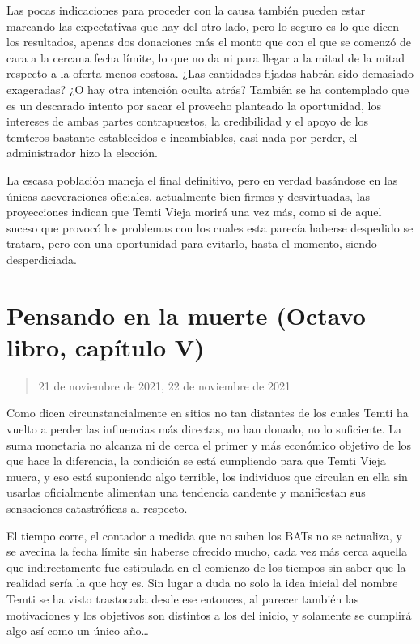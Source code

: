 \documentclass[
  spanish,
]{book}
\begin{document}
Las pocas indicaciones para proceder con la causa también pueden estar marcando las expectativas que hay del otro lado, pero lo seguro es lo que dicen los resultados, apenas dos donaciones más el monto que con el que se comenzó de cara a la cercana fecha límite, lo que no da ni para llegar a la mitad de la mitad respecto a la oferta menos costosa. ¿Las cantidades fijadas habrán sido demasiado exageradas? ¿O hay otra intención oculta atrás? También se ha contemplado que es un descarado intento por sacar el provecho planteado la oportunidad, los intereses de ambas partes contrapuestos, la credibilidad y el apoyo de los temteros bastante establecidos e incambiables, casi nada por perder, el administrador hizo la elección.

La escasa población maneja el final definitivo, pero en verdad basándose en las únicas aseveraciones oficiales, actualmente bien firmes y desvirtuadas, las proyecciones indican que Temti Vieja morirá una vez más, como si de aquel suceso que provocó los problemas con los cuales esta parecía haberse despedido se tratara, pero con una oportunidad para evitarlo, hasta el momento, siendo desperdiciada.

\hypertarget{pensando-en-la-muerte-octavo-libro-capuxedtulo-v}{%
\section{Pensando en la muerte (Octavo libro, capítulo V)}\label{pensando-en-la-muerte-octavo-libro-capuxedtulo-v}}

\begin{quote}
21 de noviembre de 2021, 22 de noviembre de 2021
\end{quote}

Como dicen circunstancialmente en sitios no tan distantes de los cuales Temti ha vuelto a perder las influencias más directas, no han donado, no lo suficiente. La suma monetaria no alcanza ni de cerca el primer y más económico objetivo de los que hace la diferencia, la condición se está cumpliendo para que Temti Vieja muera, y eso está suponiendo algo terrible, los individuos que circulan en ella sin usarlas oficialmente alimentan una tendencia candente y manifiestan sus sensaciones catastróficas al respecto.

El tiempo corre, el contador a medida que no suben los BATs no se actualiza, y se avecina la fecha límite sin haberse ofrecido mucho, cada vez más cerca aquella que indirectamente fue estipulada en el comienzo de los tiempos sin saber que la realidad sería la que hoy es. Sin lugar a duda no solo la idea inicial del nombre Temti se ha visto trastocada desde ese entonces, al parecer también las motivaciones y los objetivos son distintos a los del inicio, y solamente se cumplirá algo así como un único año\ldots{}
\end{document}
